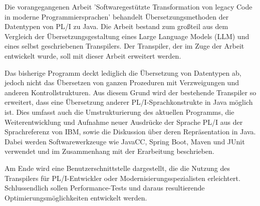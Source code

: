 Die vorangegangenen Arbeit 'Softwaregestützte Transformation von legacy Code in moderne Programmiersprachen' behandelt Übersetzungsmethoden der Datentypen von PL/I zu Java. Die Arbeit bestand zum großteil aus dem Vergleich der Übersetzungsgestaltung eines Large Language Models (LLM) und eines selbst geschriebenen Transpilers. Der Transpiler, der im Zuge der Arbeit entwickelt wurde, soll mit dieser Arbeit erweitert werden.

Das bisherige Programm deckt lediglich die Übersetzung von Datentypen ab, jedoch nicht das Übersetzen von ganzen Prozeduren mit Verzweigungen und anderen Kontrollstrukturen. Aus diesem Grund wird der bestehende Transpiler so erweitert, dass eine Übersetzung anderer PL/I-Sprachkonstrukte in Java möglich ist. Dies umfasst auch die Umstrukturierung des aktuellen Programms, die Weiterentwicklung und Aufnahme neuer Ausdrücke der Sprache PL/I aus der Sprachreferenz von IBM, sowie die Diskussion über deren Repräsentation in Java. Dabei werden Softwarewerkzeuge wie JavaCC, Spring Boot, Maven und JUnit verwendet und im Zusammenhang mit der Erarbeitung beschrieben. 

Am Ende wird eine Benutzerschnittstelle dargestellt, die die Nutzung des Transpilers für PL/I-Entwickler oder Modernisierungsspezialisten erleichtert. Schlussendlich sollen Performance-Tests und daraus resultierende Optimierungsmöglichkeiten entwickelt werden.

